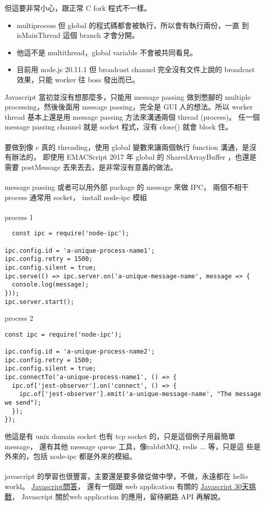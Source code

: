   但這要非常小心，跟正常 C fork 程式不一樣。
  \begin{itemize}
    \item multiprocess 但 global 的程式碼都會被執行，所以會有執行兩份，一直
      到 isMainThread 這個 branch 才會分開。
    \item 他這不是 multithread，global variable 不會被共同看見。
    \item 目前用 node.js 20.11.1 但 broadcast channel 完全沒有文件上說的
      broadcast 效果，只能 worker 往 boss 發出而已。
  \end{itemize}
  Javascript 當初並沒有想那麼多，只能用 message passing 做到憋腳的 multiple
  processing，然後後面用 message passing，完全是 GUI 人的想法。所以 worker
  thread 基本上還是用 message passing 方法來溝通兩個 thread (process)。
  任一個 message passing channel 就是 socket 程式，沒有 close() 就會 block
  住。
  \\\\
  要做到像
  c 真的 threading，使用 global 變數來讓兩個執行 function 溝通，是沒有辦法的，
  即使用 EMACScript 2017 年 global 的 SharedArrayBuffer ，也還是需要
  postMessage 丟來丟去，是非常沒有意義的做法。
  \\\\
  message passing 或者可以用外部 package 的 message 來做 IPC，
  兩個不相干 process 通常用 socket， install node-ipc 模組
  \\\\
  process 1
  \begin{verbatim}
  const ipc = require('node-ipc');

ipc.config.id = 'a-unique-process-name1';
ipc.config.retry = 1500;
ipc.config.silent = true;
ipc.serve(() => ipc.server.on('a-unique-message-name', message => {
  console.log(message);
}));
ipc.server.start();
  \end{verbatim}
  process 2
  \begin{verbatim}
const ipc = require('node-ipc');

ipc.config.id = 'a-unique-process-name2';
ipc.config.retry = 1500;
ipc.config.silent = true;
ipc.connectTo('a-unique-process-name1', () => {
  ipc.of['jest-observer'].on('connect', () => {
    ipc.of['jest-observer'].emit('a-unique-message-name', "The message we send");
  });
});
  \end{verbatim}
  他這是有 unix domain socket 也有 tcp socket 的，只是這個例子用最簡單
  message， 還有其他 message queue 工具，像rabbitMQ, redis ... 等，只是這
  些是外來的，包括 node-ipc 都是外來的模組。
  \\\\
  javascript 的學習也很豐富，主要還是要多做從做中學，不做，永遠都在 
  hello world。
  \href{https://github.com/lydiahallie/javascript-questions}{Javascript問答}，
  還有一個跟 web application 有關的
  \href{https://github.com/wesbos/JavaScript30}{Javascript 30天挑戰}，
  Javascript 關於web application 的應用，留待網路 API 再解說。

